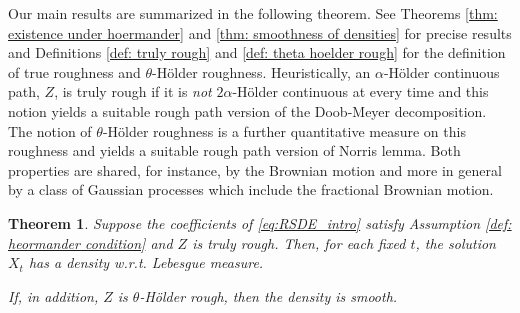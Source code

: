 \documentclass[11pt,a4paper]{article}
\theoremstyle{plain}
\newtheorem*{thm*}{Theorem}
\begin{document}

Our main results are summarized in the following theorem. See Theorems \ref{thm: existence under hoermander} and \ref{thm: smoothness of densities} for precise results and Definitions \ref{def: truly rough} and \ref{def: theta hoelder rough} for the definition of true roughness and $\theta$-Hölder roughness. Heuristically, an $\alpha$-Hölder continuous path, $Z$, is truly rough if it is \emph{not} $2\alpha$-Hölder continuous at every time and this notion yields a suitable rough path version of the Doob-Meyer decomposition. The notion of $\theta$-Hölder roughness is a further quantitative measure on this roughness and yields a suitable rough path version of Norris lemma. 
Both properties are shared, for instance, by the Brownian motion and more in general by a class of Gaussian processes which  include the fractional Brownian motion.
\begin{thm*}
    Suppose the coefficients of \eqref{eq:RSDE_intro} satisfy Assumption \ref{def: heormander condition} and $Z$ is truly rough. 
    Then, for each fixed $t$,  the solution $X_t$ has a density w.r.t. Lebesgue measure.

    If, in addition, $Z$ is $\theta$-Hölder rough, then the density is smooth. 
\end{thm*}
\end{document}
